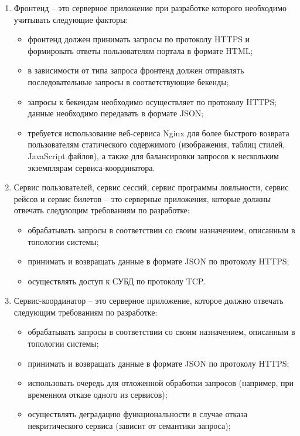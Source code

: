 \begin{enumerate}
    \item Фронтенд -- это серверное приложение при разработке которого необходимо учитывать следующие факторы:
    \begin{itemize}
        \item фронтенд должен принимать запросы по протоколу HTTPS и формировать ответы пользователям портала в формате HTML;
        \item в зависимости от типа запроса фронтенд должен отправлять последовательные запросы в соответствующие бекенды;
        \item запросы к бекендам необходимо осуществляет по протоколу HTTPS; данные необходимо передавать в формате JSON;
        \item требуется использование веб-сервиса Nginx для более быстрого возврата пользователям статического содержимого (изображения, таблиц стилей, JavaScript файлов), а также для балансировки запросов к нескольким экземплярам сервиса-координатора.
    \end{itemize}
    \item Сервис пользователей, сервис сессий, сервис программы лояльности, сервис рейсов и сервис билетов -- это серверные приложения, которые должны отвечать следующим требованиям по разработке:
    \begin{itemize}
        \item обрабатывать запросы в соответствии со своим назначением, описанным в топологии системы;
        \item принимать и возвращать данные в формате JSON по протоколу HTTPS;
        \item осуществлять доступ к СУБД по протоколу TCP.
    \end{itemize}
    \item Сервис-координатор -- это серверное приложение, которое должно отвечать следующим требованиям по разработке:
    \begin{itemize}
        \item обрабатывать запросы в соответствии со своим назначением, описанным в топологии системы;
        \item принимать и возвращать данные в формате JSON по протоколу HTTPS;
        \item использовать очередь для отложенной обработки запросов (например, при временном отказе одного из сервисов);
        \item осуществлять деградацию функциональности в случае отказа некритического сервиса (зависит от семантики запроса);

\end{itemize}
\end{enumerate}

